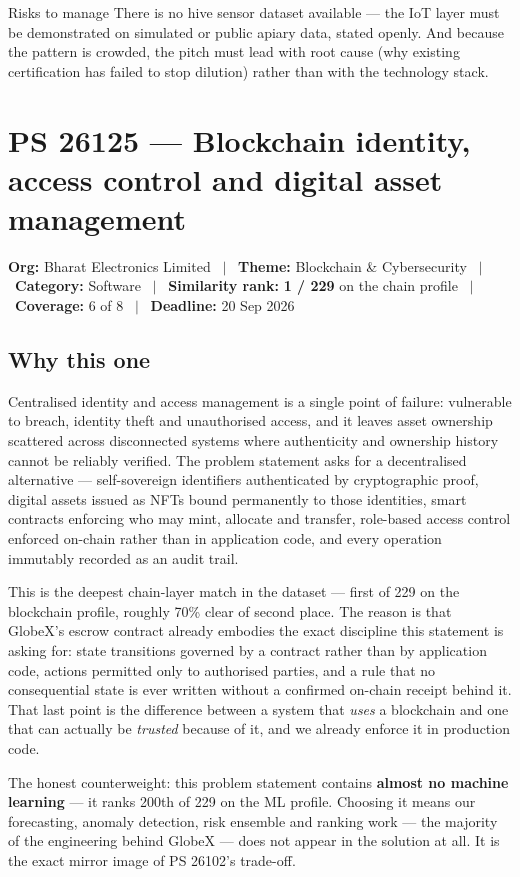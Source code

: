 \documentclass[11pt]{article}
\newcommand{\psbanner}[6]{%
  \vspace{0.2em}
  {\footnotesize\color{gxslate}\textbf{Org:} #1 \ $\vert$ \ \textbf{Theme:} #2 \ $\vert$ \ \textbf{Category:} #3 \ $\vert$ \ \textbf{Similarity rank:} #4 \ $\vert$ \ \textbf{Coverage:} #5 \ $\vert$ \ \textbf{Deadline:} #6}
  \par\vspace{0.6em}
}
\begin{document}
\begin{warnbox}{Risks to manage}
There is no hive sensor dataset available --- the IoT layer must be demonstrated on simulated or public
apiary data, stated openly. And because the pattern is crowded, the pitch must lead with root cause (why
existing certification has failed to stop dilution) rather than with the technology stack.
\end{warnbox}

\clearpage
\section{PS 26125 --- Blockchain identity, access control and digital asset management}
\psbanner{Bharat Electronics Limited}{Blockchain \& Cybersecurity}{Software}{\textbf{1 / 229} on the chain profile}{6 of 8}{20 Sep 2026}

\subsection*{Why this one}
Centralised identity and access management is a single point of failure: vulnerable to breach, identity
theft and unauthorised access, and it leaves asset ownership scattered across disconnected systems where
authenticity and ownership history cannot be reliably verified. The problem statement asks for a
decentralised alternative --- self-sovereign identifiers authenticated by cryptographic proof, digital
assets issued as NFTs bound permanently to those identities, smart contracts enforcing who may mint,
allocate and transfer, role-based access control enforced on-chain rather than in application code, and
every operation immutably recorded as an audit trail.

This is the deepest chain-layer match in the dataset --- first of 229 on the blockchain profile, roughly
70\% clear of second place. The reason is that GlobeX's escrow contract already embodies the exact
discipline this statement is asking for: state transitions governed by a contract rather than by
application code, actions permitted only to authorised parties, and a rule that no consequential state is
ever written without a confirmed on-chain receipt behind it. That last point is the difference between a
system that \emph{uses} a blockchain and one that can actually be \emph{trusted} because of it, and we
already enforce it in production code.

\vspace{0.4em}
\noindent The honest counterweight: this problem statement contains \textbf{almost no machine learning}
--- it ranks 200th of 229 on the ML profile. Choosing it means our forecasting, anomaly detection, risk
ensemble and ranking work --- the majority of the engineering behind GlobeX --- does not appear in the
solution at all. It is the exact mirror image of PS 26102's trade-off.
\end{document}
